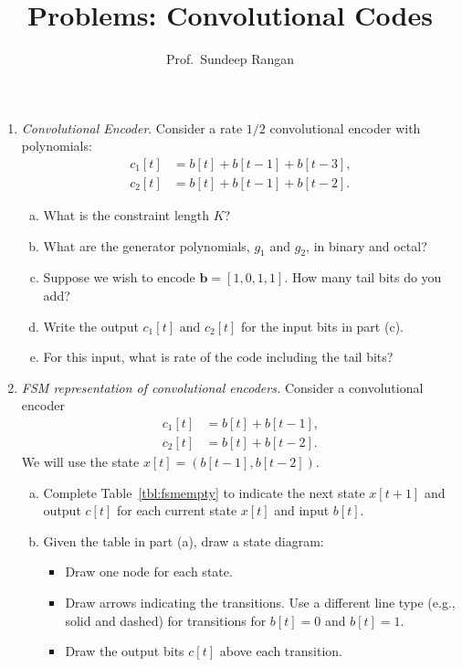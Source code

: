 \documentclass[11pt]{article}
\newcommand{\bs}[1]{{\boldsymbol{{#1}}}}
\begin{document}
\title{Problems:  Convolutional Codes}
\author{Prof.\ Sundeep Rangan}
\date{}

\maketitle

\begin{enumerate}

\item \emph{Convolutional Encoder}.  Consider a rate $1/2$ convolutional
encoder with polynomials:
\begin{align*}
    c_1[t] &= b[t]+b[t-1]+b[t-3], \\
    c_2[t] &= b[t]+b[t-1]+b[t-2].
\end{align*}
\begin{enumerate}[(a)]
\item What is the constraint length $K$?
\item What are the generator polynomials, $g_1$ and $g_2$,
in binary and octal?
\item Suppose we wish to encode $\bs{b}=[1,0,1,1]$.
How many tail bits do you add?
\item Write the output $c_1[t]$ and $c_2[t]$ for the input bits in
part (c).
\item For this input, what is rate of the code including the tail bits?


\end{enumerate}


\item \label{prob:fsm}
\emph{FSM representation of convolutional encoders.}
Consider a convolutional encoder
\begin{align*}
    c_1[t] &= b[t] + b[t-1], \\
    c_2[t] &= b[t] + b[t-2].
\end{align*}
We will use the state $x[t] = (b[t-1],b[t-2])$.
\begin{enumerate}[(a)]
\item Complete Table~\ref{tbl:fsmempty} to indicate the next
state $x[t+1]$ and output $c[t]$ for each current state $x[t]$
and input $b[t]$.

\item Given the table in part (a), draw a state diagram:
\begin{itemize}
\item Draw one node for each state.
\item Draw arrows indicating the transitions.  Use a different
line type (e.g., solid and dashed) for transitions for $b[t]=0$
and $b[t]=1$.
\item Draw the output bits $c[t]$ above each transition.
\end{itemize}
\end{enumerate}



\end{enumerate}
\end{document}
